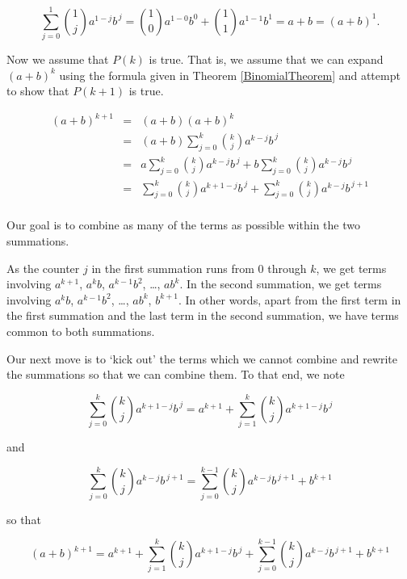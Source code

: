 \documentclass{ximera}
\begin{document}
\[ \displaystyle{\sum_{j=0}^{1} \binom{1}{j} a^{1-j} b^{\, j}} =  \displaystyle{\binom{1}{0}a^{1-0}b^{0} +  \binom{1}{1}a^{1-1}b^{1}} = a+b = (a+b)^{1}. \]



Now we assume that $P(k)$ is true.  That is, we assume that we can expand $(a+b)^k$ using the formula given in Theorem \ref{BinomialTheorem}  and attempt to show that $P(k+1)$ is true.

\[ \begin{array}{rcl}

(a+b)^{k+1} & = & (a+b)(a+b)^{k} \\  
            & = & (a+b) \displaystyle{\sum_{j=0}^{k} \binom{k}{j} a^{k-j} b^{\, j}}  \\  
            & = & a \displaystyle{\sum_{j=0}^{k} \binom{k}{j} a^{k-j} b^{\, j}} +  b \displaystyle{\sum_{j=0}^{k} \binom{k}{j} a^{k-j} b^{\, j}} \\  
            & = & \displaystyle{\sum_{j=0}^{k} \binom{k}{j} a^{k+1-j} b^{\, j}} +  \displaystyle{\sum_{j=0}^{k} \binom{k}{j} a^{k-j} b^{\, j+1}} \\             
            
\end{array} \]

Our goal is to combine as many of the terms as possible within the two summations. 

 

As the counter $j$ in the first summation runs from $0$ through $k$, we get terms involving $a^{k+1}$, $a^{k}b$, $a^{k-1}b^2$, \ldots, $ab^{k}$.   In the second summation,   we get terms involving $a^{k}b$, $a^{k-1}b^{2}$, \ldots, $ab^{k}$, $b^{k+1}$.  In other words, apart from the first term in the first summation and the last term in the second summation, we have terms common to both summations. 

 

Our next move is to `kick out' the terms which we cannot combine and rewrite the summations so that we can combine them.  To that end, we note

\[ \displaystyle{\sum_{j=0}^{k} \binom{k}{j} a^{k+1-j} b^{\, j} = a^{k+1}+ \sum_{j=1}^{k} \binom{k}{j} a^{k+1-j} b^{\, j}}\]

and

\[ \displaystyle{\sum_{j=0}^{k} \binom{k}{j} a^{k-j} b^{\, j+1} = \sum_{j=0}^{k-1} \binom{k}{j} a^{k-j} b^{\, j+1} + b^{k+1}}\]

so that

\[ (a+b)^{k+1} = \displaystyle{a^{k+1} + \sum_{j=1}^{k} \binom{k}{j} a^{k+1-j} b^{\, j} + \sum_{j=0}^{k-1} \binom{k}{j} a^{k-j} b^{\, j+1}  + b^{k+1}}\]
\end{document}

